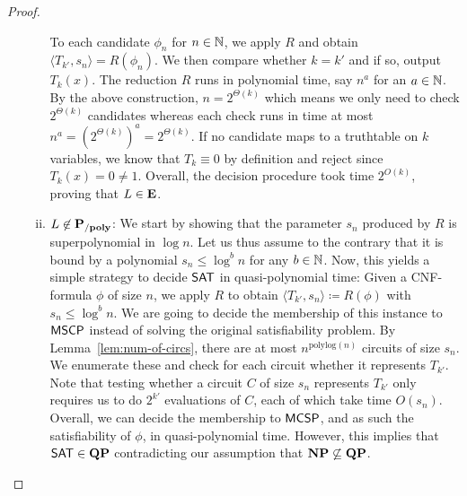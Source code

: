 \documentclass[11pt]{article}
\begin{document}
\begin{proof}
\begin{itemize}
\begin{enumerate}[(i)]
          To each candidate $\phi_n$ for $n \in {\mathbb{N}}$, we apply $R$ and obtain
          $\langle T_{k'}, s_n \rangle = R(\phi_n)$.
          We then compare whether $k = k'$ and if so, output $T_k(x)$.
          The reduction $R$ runs in polynomial time, say $n^a$ for an
          $a \in {\mathbb{N}}$.
          By the above construction, $n = 2^{\Theta(k)}$ which means we
          only need to check $2^{\Theta(k)}$ candidates whereas each check
          runs in time at most $n^a = (2^{\Theta(k)})^a = 2^{\Theta(k)}$.
          If no candidate maps to a truthtable on $k$ variables, we know
          that $T_k \equiv 0$ by definition and reject since
          $T_k(x) = 0 \not= 1$.
          Overall, the decision procedure took time $2^{O(k)}$, proving
          that $L \in \mathbf{E}$.

        \item $L \not\in \mathbf{P_{/poly}}$:
          We start by showing that the parameter $s_n$ produced by $R$ is
          superpolynomial in $\log n$.
          Let us thus assume to the contrary that it is bound by a polynomial
          $s_n \le \log^b n$ for any $b \in {\mathbb{N}}$.
          Now, this yields a simple strategy to decide $\mathsf{SAT}$ in
          quasi-polynomial time:
          Given a CNF-formula $\phi$ of size $n$, we apply
          $R$ to obtain $\langle T_{k'}, s_n \rangle \coloneqq R(\phi)$
          with $s_n \le \log^b n$.
          We are going to decide the membership of this instance to
          $\mathsf{MSCP}$ instead of solving
          the original satisfiability problem.
          By Lemma~\ref{lem:num-of-circs}, there are at most
          $n^{\mathrm{polylog}(n)}$ circuits of size $s_n$.
          We enumerate these and check for each circuit whether
          it represents $T_{k'}$.
          Note that testing whether a circuit $C$ of size $s_n$ represents
          $T_{k'}$ only requires us to do $2^{k'}$ evaluations of $C$, each of
          which take time $O(s_n)$.
          Overall, we can decide the membership to $\mathsf{MCSP}$, and
          as such the satisfiability of $\phi$, in quasi-polynomial time.
          However, this implies that $\mathsf{SAT} \in \mathbf{QP}$
          contradicting our assumption that $\mathbf{NP} \not\subseteq \mathbf{QP}$.


\end{enumerate}
\end{itemize}
\end{proof}
\end{document}
